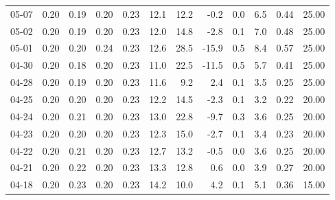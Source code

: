 \begin{threeparttable}
{\begin{tabular}{lrrrrrrrrrrr}
  05-07 &          0.20 &          0.19 &          0.20 &        0.23 &                12.1 &                12.2 &       -0.2 &                 0.0 &              6.5 &            0.44 &                  25.00 \\
  05-02 &          0.20 &          0.19 &          0.20 &        0.23 &                12.0 &                14.8 &       -2.8 &                 0.1 &              7.0 &            0.48 &                  25.00 \\
  05-01 &          0.20 &          0.20 &          0.24 &        0.23 &                12.6 &                28.5 &      -15.9 &                 0.5 &              8.4 &            0.57 &                  25.00 \\
  04-30 &          0.20 &          0.18 &          0.20 &        0.23 &                11.0 &                22.5 &      -11.5 &                 0.5 &              5.7 &            0.41 &                  25.00 \\
  04-28 &          0.20 &          0.19 &          0.20 &        0.23 &                11.6 &                 9.2 &        2.4 &                 0.1 &              3.5 &            0.25 &                  25.00 \\
  04-25 &          0.20 &          0.20 &          0.20 &        0.23 &                12.2 &                14.5 &       -2.3 &                 0.1 &              3.2 &            0.22 &                  20.00 \\
  04-24 &          0.20 &          0.21 &          0.20 &        0.23 &                13.0 &                22.8 &       -9.7 &                 0.3 &              3.6 &            0.25 &                  20.00 \\
  04-23 &          0.20 &          0.20 &          0.20 &        0.23 &                12.3 &                15.0 &       -2.7 &                 0.1 &              3.4 &            0.23 &                  20.00 \\
  04-22 &          0.20 &          0.21 &          0.20 &        0.23 &                12.7 &                13.2 &       -0.5 &                 0.0 &              3.6 &            0.25 &                  20.00 \\
  04-21 &          0.20 &          0.22 &          0.20 &        0.23 &                13.3 &                12.8 &        0.6 &                 0.0 &              3.9 &            0.27 &                  20.00 \\
  04-18 &          0.20 &          0.23 &          0.20 &        0.23 &                14.2 &                10.0 &        4.2 &                 0.1 &              5.1 &            0.36 &                  15.00 \\

\end{tabular}}
\end{threeparttable}
